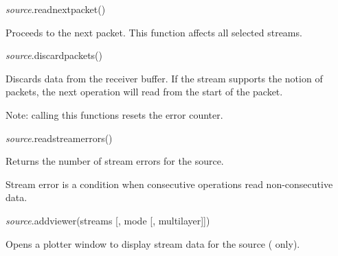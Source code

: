\documentclass[a4paper,12pt,twoside,extrafontsizes]{memoir}
\begin{document}

\begin{luafuncprototype}
\emph{source}.readnextpacket()
\end{luafuncprototype}

\begin{funcdescr}
	Proceeds to the next packet. This function affects all selected streams.
\end{funcdescr}


\begin{luafuncprototype}
\emph{source}.discardpackets()
\end{luafuncprototype}

\begin{funcdescr}
	Discards data from the receiver buffer. If the stream supports the notion of packets, the next operation will read from the start of the packet.
\end{funcdescr}

\begin{funcremarks}
	Note: calling this functions resets the error counter.
\end{funcremarks}


\begin{luafuncprototype}
\emph{source}.readstreamerrors()
\end{luafuncprototype}

\begin{funcret}
	Returns the number of stream errors for the source.
\end{funcret}

\begin{funcremarks}
	Stream error is a condition when consecutive operations read non-consecutive data.
\end{funcremarks}


\begin{luafuncprototype}
\emph{source}.addviewer(streams [, mode [, multilayer]])
\end{luafuncprototype}

\begin{funcdescr}
	Opens a plotter window to display stream data for the source ( only).
\end{funcdescr}
\end{document}
